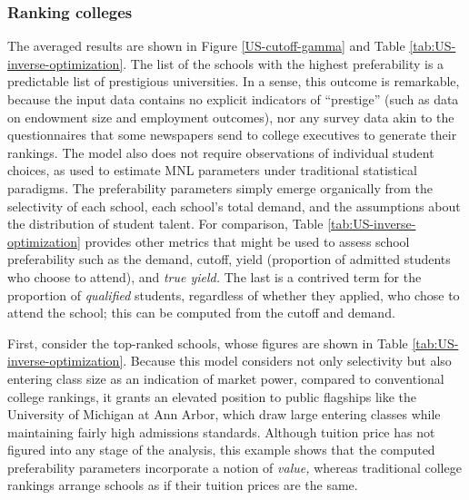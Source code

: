 \documentclass[12pt]{article}
\numberwithin{equation}{subsection}
\theoremstyle{definition}
\begin{document}
\subsubsection{Ranking colleges}
The averaged results are shown in Figure \ref{US-cutoff-gamma} and Table \ref{tab:US-inverse-optimization}. The list of the schools with the highest preferability is a predictable list of prestigious universities. In a sense, this outcome is remarkable, because the input data contains no explicit indicators of ``prestige'' (such as data on endowment size and employment outcomes), nor any survey data akin to the questionnaires that some newspapers send to college executives to generate their rankings. The model also does not require observations of individual student choices, as used to estimate MNL parameters under traditional statistical paradigms. The preferability parameters simply emerge organically from the selectivity of each school, each school's total demand, and the assumptions about the distribution of student talent. For comparison, Table \ref{tab:US-inverse-optimization} provides other metrics that might be used to assess school preferability such as the demand, cutoff, yield (proportion of admitted students who choose to attend), and \emph{true yield.} The last is a contrived term for the proportion of \emph{qualified} students, regardless of whether they applied, who chose to attend the school; this can be computed from the cutoff and demand. 

First, consider the top-ranked schools, whose figures are shown in Table \ref{tab:US-inverse-optimization}. Because this model considers not only selectivity but also entering class size as an indication of market power, compared to conventional college rankings, it grants an elevated position to public flagships like the University of Michigan at Ann Arbor, which draw large entering classes while maintaining fairly high admissions standards. Although tuition price has not figured into any stage of the analysis, this example shows that the computed preferability parameters incorporate a notion of \emph{value,} whereas traditional college rankings arrange schools as if their tuition prices are the same.
\end{document}
